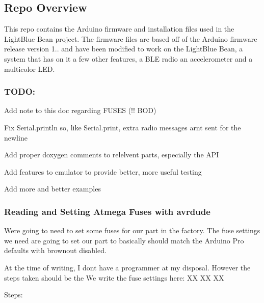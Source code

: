 \subsection*{Repo Overview }

This repo contains the Arduino firmware and installation files used in the Light\+Blue Bean project. The firmware files are based off of the Arduino firmware release version 1.. and have been modified to work on the Light\+Blue Bean, a system that has on it a few other features, a B\+L\+E radio an accelerometer and a multicolor L\+E\+D.

\subsubsection*{T\+O\+D\+O\+:}


\begin{DoxyItemize}
\item Add note to this doc regarding F\+U\+S\+E\+S (!! B\+O\+D)
\item Fix Serial.\+println so, like Serial.\+print, extra radio messages arn\textquotesingle{}t sent for the newline
\item Add proper doxygen comments to relelvent parts, especially the A\+P\+I
\item Add features to emulator to provide better, more useful testing
\item Add more and better examples
\end{DoxyItemize}

\subsubsection*{Reading and Setting Atmega Fuses with avrdude}

We\textquotesingle{}re going to need to set some fuses for our part in the factory. The fuse settings we need are going to set our part to basically should match the Arduino Pro defaults with brownout disabled.

At the time of writing, I don\textquotesingle{}t have a programmer at my disposal. However the steps taken should be the We write the fuse settings here\+: X\+X X\+X X\+X

Steps\+:


